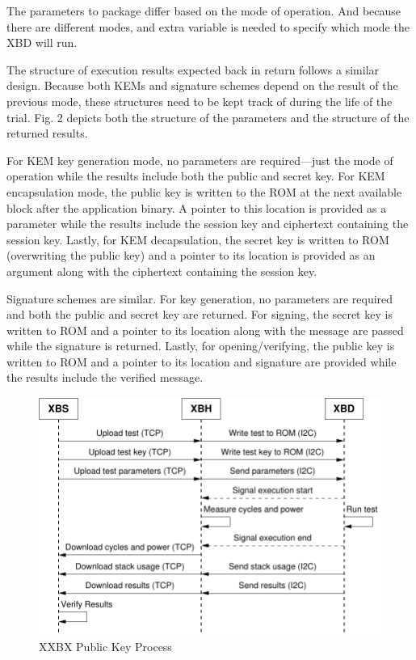 \documentclass[10pt]{article}
\begin{document}
The parameters to package differ based on the mode of operation. And because there are 
different modes, and extra variable is needed to specify which mode the XBD will run.

The structure of execution results expected back in return follows a similar design. 
Because both KEMs and signature schemes depend on the result of the previous mode, these 
structures need to be kept track of during the life of the trial. Fig. 2 depicts both the 
structure of the parameters and the structure of the returned results.

For KEM key generation mode, no parameters are required—just the mode of operation while 
the results include both the public and secret key. For KEM encapsulation mode, the 
public key is written to the ROM at the next available block after the application binary. 
A pointer to this location is provided as a parameter while the results include the session 
key and ciphertext containing the session key. Lastly, for KEM decapsulation, the secret key 
is written to ROM (overwriting the public key) and a pointer to its location is provided as 
an argument along with the ciphertext containing the session key.

Signature schemes are similar. For key generation, no parameters are required and both the 
public and secret key are returned. For signing, the secret key is written to ROM and a 
pointer to its location along with the message are passed while the signature is returned. 
Lastly, for opening/verifying, the public key is written to ROM and a pointer to its location 
and signature are provided while the results include the verified message.

\begin{figure}[ht]
    \centering
    \includegraphics[scale=0.8]{../figures/xxbx_pk.pdf}
    \caption{XXBX Public Key Process}
    \label{fig:xxbx_pk}
\end{figure}
\end{document}
